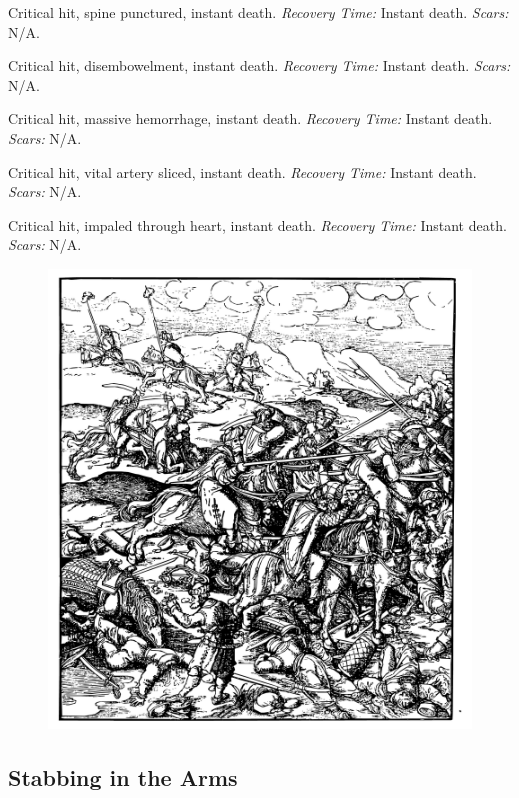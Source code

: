 \documentclass[12pt]{book}
\begin{document}
\begin{description}[labelwidth=1.5em, leftmargin=*, itemsep=0.4em]
    \item[16 -] Critical hit, spine punctured, instant death. \textit{Recovery Time:} Instant death. \textit{Scars:} N/A.
    \item[17 -] Critical hit, disembowelment, instant death. \textit{Recovery Time:} Instant death. \textit{Scars:} N/A.
    \item[18 -] Critical hit, massive hemorrhage, instant death. \textit{Recovery Time:} Instant death. \textit{Scars:} N/A.
    \item[19 -] Critical hit, vital artery sliced, instant death. \textit{Recovery Time:} Instant death. \textit{Scars:} N/A.
    \item[20 -] Critical hit, impaled through heart, instant death. \textit{Recovery Time:} Instant death. \textit{Scars:} N/A.
\end{description}

\begin{figure}[h]
    \centering
    \includegraphics[width=\textwidth]{./images/combat10.pdf}
\end{figure}

\subsection{Stabbing in the Arms}
\end{document}
